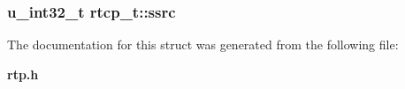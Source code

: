 \subsubsection{\setlength{\rightskip}{0pt plus 5cm}u\_\-int32\_\-t {\bf rtcp\_\-t::ssrc}}\label{structrtcp__t_o1}




The documentation for this struct was generated from the following file:\begin{CompactItemize}
\item 
{\bf rtp.h}\end{CompactItemize}
